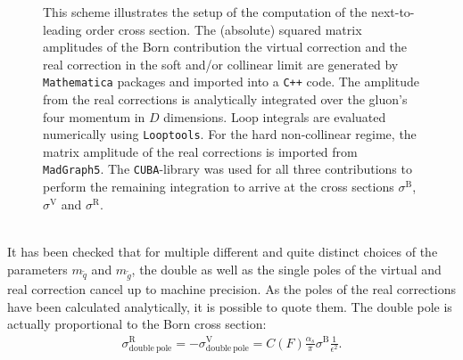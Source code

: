 \begin{figure}[!htbp]
\begin{center}
\caption{This scheme illustrates the setup of the computation of the next-to-leading order cross section. The (absolute) squared matrix amplitudes of the Born contribution the virtual correction and the real correction in the soft and/or collinear limit are generated by \texttt{Mathematica} packages and imported into a \texttt{C++} code. The amplitude from the real corrections is analytically integrated over the gluon's four momentum in $D$ dimensions. Loop integrals are evaluated numerically using \texttt{Looptools}. For the hard non-collinear regime, the matrix amplitude of the real corrections is imported from \texttt{MadGraph5}. The \texttt{CUBA}-library was used for all three contributions to perform the remaining integration to arrive at the cross sections $\sigma^{\mathrm{B}}$, $\sigma^{\mathrm{V}}$ and $\sigma^{\mathrm{R}}$.}\label{fig:CalcSetup}
\end{center}
\end{figure}\\
It has been checked that for multiple different and quite distinct choices of the parameters $m_{\tilde{q}}$ and $m_{\tilde{g}}$, the double as well as the single poles of the virtual and real correction cancel up to machine precision. As the poles of the real corrections have been calculated analytically, it is possible to quote them. The double pole is actually proportional to the Born cross section:
\begin{align}
\sigma^{\mathrm{R}}_{\mathrm{double\ pole}} = -\sigma^{\mathrm{V}}_{\mathrm{double\ pole}} = C(F)\frac{\alpha_s}{\pi}\sigma^{\mathrm{B}} \frac{1}{\epsilon^2}.
\end{align}

